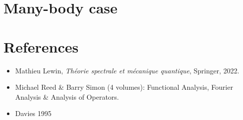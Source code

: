 \documentclass{article}
\begin{document}
\section{Many-body case}

\section*{References}

\begin{itemize}
  \item Mathieu Lewin, \textit{Th\'eorie spectrale et mécanique quantique}, Springer, 2022.
  \item Michael Reed \& Barry Simon (4 volumes): Functional Analysis, Fourier Analysis \& Analysis of Operators.
  \item Davies 1995 
\end{itemize}
\end{document}
